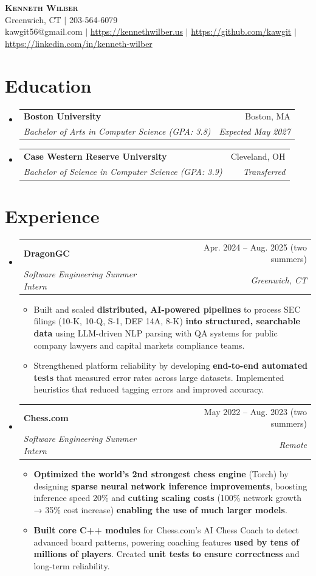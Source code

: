 \documentclass[letterpaper,11pt]{article}
\makeatletter
\newcommand{\resumeItem}[1]{
  \item\small{
    {#1 \vspace{-2pt}}
  }
}
\newcommand{\resumeSubheading}[4]{
  \vspace{-2pt}\item
    \begin{tabular*}{0.97\textwidth}[t]{l@{\extracolsep{\fill}}r}
      \textbf{#1} & #2 \\
      \textit{\small#3} & \textit{\small #4} \\
    \end{tabular*}\vspace{-7pt}
}
\newcommand{\resumeSubHeadingListStart}{\begin{itemize}[leftmargin=0.15in, label={}]}
\newcommand{\resumeSubHeadingListEnd}{\end{itemize}}
\newcommand{\resumeItemListStart}{\begin{itemize}}
\newcommand{\resumeItemListEnd}{\end{itemize}\vspace{-5pt}}
\makeatother
\begin{document}
\begin{center}
    \textbf{\Huge \scshape Kenneth Wilber} \\ \vspace{1pt}
    \small 
    Greenwich, CT $|$ 203-564-6079\\
    kawgit56@gmail.com $|$
    \underline{https://kennethwilber.us} $|$
    \underline{https://github.com/kawgit} $|$
    \underline{https://linkedin.com/in/kenneth-wilber} \\
\end{center}

\section{Education}
  \resumeSubHeadingListStart
    \resumeSubheading
      {Boston University}{Boston, MA}
      {Bachelor of Arts in Computer Science (GPA: 3.8)}{Expected May 2027}
    \resumeSubheading
      {Case Western Reserve University}{Cleveland, OH}
      {Bachelor of Science in Computer Science (GPA: 3.9)}{Transferred}
  \resumeSubHeadingListEnd

\section{Experience}
  \resumeSubHeadingListStart
    \resumeSubheading
      {DragonGC}{Apr. 2024 -- Aug. 2025 (two summers)}
      {Software Engineering Summer Intern}{Greenwich, CT}
      \resumeItemListStart
        \resumeItem{Built and scaled \textbf{distributed, AI-powered pipelines} to process SEC filings (10-K, 10-Q, S-1, DEF 14A, 8-K) \textbf{into structured, searchable data} using LLM-driven NLP parsing with QA systems for public company lawyers and capital markets compliance teams.}
        \resumeItem{Strengthened platform reliability by developing \textbf{end-to-end automated tests} that measured error rates across large datasets. Implemented heuristics that reduced tagging errors and improved accuracy.}
      \resumeItemListEnd

    \resumeSubheading
      {Chess.com}{May 2022 -- Aug. 2023 (two summers)}
      {Software Engineering Summer Intern}{Remote}
      \resumeItemListStart
        \resumeItem{\textbf{Optimized the world’s 2nd strongest chess engine} (Torch) by designing \textbf{sparse neural network inference improvements}, boosting inference speed 20\% and \textbf{cutting scaling costs} (100\% network growth → 35\% cost increase) \textbf{enabling the use of much larger models}.}
        \resumeItem{\textbf{Built core C++ modules} for Chess.com’s AI Chess Coach to detect advanced board patterns, powering coaching features \textbf{used by tens of millions of players}. Created \textbf{unit tests to ensure correctness} and long-term reliability.}
      \resumeItemListEnd
  \resumeSubHeadingListEnd
\end{document}
